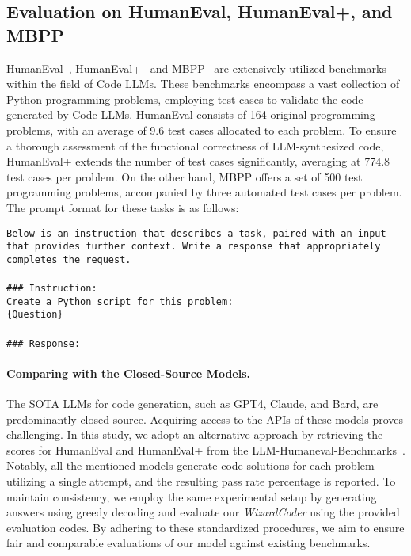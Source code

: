 \documentclass{article}
\newcommand{\modelname}{\emph{WizardCoder}}
\begin{document}
\subsection{Evaluation on HumanEval, HumanEval+, and MBPP}

HumanEval~\cite{humeval}, HumanEval+~\cite{humanevalp} and MBPP~\cite{MBPP} are extensively utilized benchmarks within the field of Code LLMs. These benchmarks encompass a vast collection of Python programming problems, employing test cases to validate the code generated by Code LLMs. HumanEval consists of 164 original programming problems, with an average of 9.6 test cases allocated to each problem. To ensure a thorough assessment of the functional correctness of LLM-synthesized code, HumanEval+ extends the number of test cases significantly, averaging at 774.8 test cases per problem. On the other hand, MBPP offers a set of 500 test programming problems, accompanied by three automated test cases per problem. The prompt format for these tasks is as follows:
\begin{boxEnv}
\texttt{Below is an instruction that describes a task, paired with an input that provides further context. Write a response that appropriately completes the request. \\\\\#\#\# Instruction:\\
Create a Python script for this problem:\\\{Question\}\\ \\\#\#\# Response:}
\end{boxEnv}

\paragraph{Comparing with the Closed-Source Models.} The SOTA LLMs for code generation, such as GPT4, Claude, and Bard, are predominantly closed-source. Acquiring access to the APIs of these models proves challenging. In this study, we adopt an alternative approach by retrieving the scores for HumanEval and HumanEval+ from the LLM-Humaneval-Benchmarks~\cite{llm-humaneval-benchmarks}. Notably, all the mentioned models generate code solutions for each problem utilizing a single attempt, and the resulting pass rate percentage is reported. To maintain consistency, we employ the same experimental setup by generating answers using greedy decoding and evaluate our \modelname{} using the provided evaluation codes. By adhering to these standardized procedures, we aim to ensure fair and comparable evaluations of our model against existing benchmarks.
\end{document}
